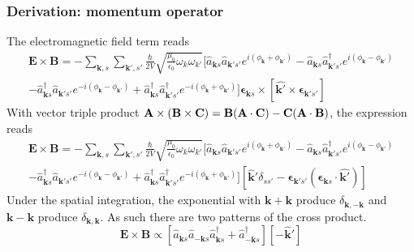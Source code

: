 \documentclass[../../../main.tex]{subfiles}
\begin{document}
\subsubsection{Derivation: momentum operator}
The electromagnetic field term reads 
\begin{multline*}
  \mathbf{E }\times \mathbf{B}
  = - \sum_{\mathbf{k },s} \sum_{\mathbf{k }',s'}  \frac{\hbar  }{2V} \sqrt{\frac{\mu_0 }{\epsilon_0 }\omega_k \omega_{k'}}
    \bigg[ \hat{a}_{\mathbf{k }s} \hat{a}_{\mathbf{k }'s'}  e ^{i(\phi_{\mathbf{k }} +\phi_{\mathbf{k }'})} 
  -\hat{a}_{\mathbf{k }s} \hat{a}^\dagger_{\mathbf{k }'s'} e ^{i(\phi_{\mathbf{k }}-\phi_{\mathbf{k }'})} \\ 
   -\hat{a}_{\mathbf{k }s} ^\dagger\hat{a}_{\mathbf{k }'s'} e ^{-i(\phi_{\mathbf{k }}-\phi_{\mathbf{k }'})}  
   +\hat{a}^\dagger_{\mathbf{k }s} \hat{a}^\dagger_{\mathbf{k }'s'} e ^{-i(\phi_{\mathbf{k }}+\phi_{\mathbf{k }'})} \bigg]
  \boldsymbol{\epsilon}_{\mathbf{k}s} \times \left[ \hat{\mathbf{k }'}\times \boldsymbol{\epsilon}_{\mathbf{k }'s'}  \right] 
\end{multline*}
With vector triple product $    \mathbf{A} \times (\mathbf{B} \times \mathbf{C}) = \mathbf{B}(\mathbf{A} \cdot \mathbf{C}) - \mathbf{C}(\mathbf{A} \cdot \mathbf{B})$,  the expression reads
\begin{multline*}
  \mathbf{E }\times \mathbf{B}
  = - \sum_{\mathbf{k },s} \sum_{\mathbf{k }',s'}  \frac{\hbar  }{2V} \sqrt{\frac{\mu_0 }{\epsilon_0 }\omega_k \omega_{k'}}
    \bigg[ \hat{a}_{\mathbf{k }s} \hat{a}_{\mathbf{k }'s'}  e ^{i(\phi_{\mathbf{k }} +\phi_{\mathbf{k }'})} 
  -\hat{a}_{\mathbf{k }s} \hat{a}^\dagger_{\mathbf{k }'s'} e ^{i(\phi_{\mathbf{k }}-\phi_{\mathbf{k }'})} \\ 
   -\hat{a}_{\mathbf{k }s} ^\dagger\hat{a}_{\mathbf{k }'s'} e ^{-i(\phi_{\mathbf{k }}-\phi_{\mathbf{k }'})}  
   +\hat{a}^\dagger_{\mathbf{k }s} \hat{a}^\dagger_{\mathbf{k }'s'} e ^{-i(\phi_{\mathbf{k }}+\phi_{\mathbf{k }'})} \bigg]
    \left[ \hat{\mathbf{k}}'\delta_{ss'}-\boldsymbol{\epsilon}_{\mathbf{k}'s'}\left( \boldsymbol{\epsilon}_{\mathbf{k }s}\cdot \hat{\mathbf{k}'} \right) \right] 
\end{multline*}
Under the spatial integration, the exponential with $\mathbf{k }+\mathbf{k}$ produce $\delta_{\mathbf{k },-\mathbf{k}}$ and $\mathbf{k }-\mathbf{k}$ produce $\delta_{\mathbf{k },\mathbf{k}}$.
As  such there are two patterns of the cross product.
\begin{equation*}
  \mathbf{E }\times \mathbf{B}  \propto
  \left[ \hat{a}_{\mathbf{k }s} \hat{a}_{-\mathbf{k }s}  \hat{a}^\dagger_{\mathbf{k }s}+ \hat{a}^\dagger_{-\mathbf{k }s} \right] \left[ -\mathbf{\hat{k}}' \right] 
\end{equation*}
\end{document}
